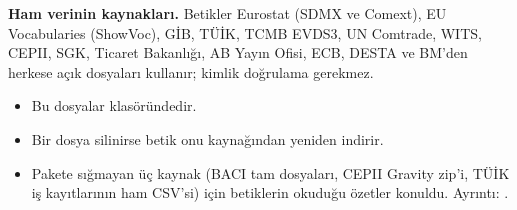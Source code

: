 \textbf{Ham verinin kaynakları.} Betikler Eurostat (SDMX ve Comext), EU Vocabularies (ShowVoc), GİB, TÜİK, TCMB EVDS3, UN Comtrade, WITS, CEPII, SGK, Ticaret Bakanlığı, AB Yayın Ofisi, ECB, DESTA ve BM'den herkese açık dosyaları kullanır; kimlik doğrulama gerekmez.

\begin{itemize}
\tightlist
\item
  Bu dosyalar  klasöründedir.
\item
  Bir dosya silinirse betik onu kaynağından yeniden indirir.
\item
  Pakete sığmayan üç kaynak (BACI tam dosyaları, CEPII Gravity zip'i, TÜİK iş kayıtlarının ham CSV'si) için betiklerin okuduğu özetler konuldu. Ayrıntı: .
\end{itemize}
